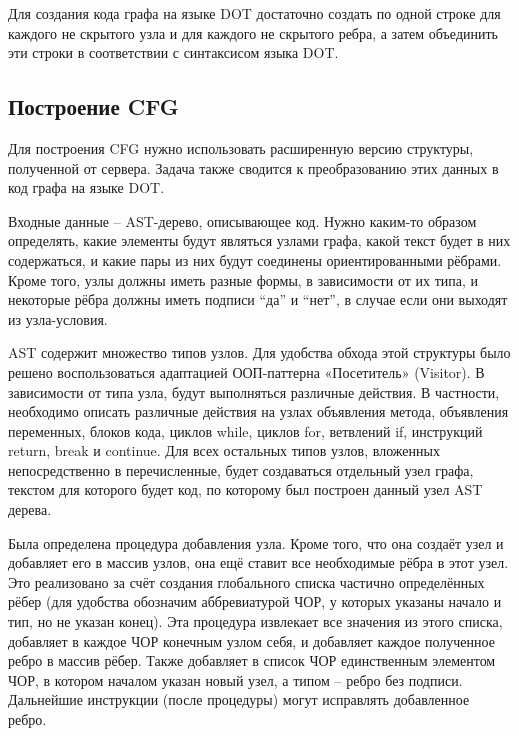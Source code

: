 Для создания кода графа на языке DOT достаточно создать по одной строке для каждого не скрытого узла и для каждого не скрытого ребра, а затем объединить эти строки в соответствии с синтаксисом языка DOT.
\subsection{Построение CFG} \label{ch2:subsec-title-abbr}
Для построения CFG нужно использовать расширенную версию структуры, полученной от сервера. Задача также сводится к преобразованию этих данных в код графа на языке DOT.

Входные данные – AST-дерево, описывающее код. Нужно каким-то образом определять, какие элементы будут являться узлами графа, какой текст будет в них содержаться, и какие пары из них будут соединены ориентированными рёбрами. Кроме того, узлы должны иметь разные формы, в зависимости от их типа, и некоторые рёбра должны иметь подписи “да” и “нет”, в случае если они выходят из узла-условия.

AST содержит множество типов узлов. Для удобства обхода этой структуры было решено воспользоваться адаптацией ООП-паттерна «Посетитель» (Visitor). В зависимости от типа узла, будут выполняться различные действия. В частности, необходимо описать различные действия на узлах объявления метода, объявления переменных, блоков кода, циклов while, циклов for, ветвлений if, инструкций return, break и continue. Для всех остальных типов узлов, вложенных непосредственно в перечисленные, будет создаваться отдельный узел графа, текстом для которого будет код, по которому был построен данный узел AST дерева.

Была определена процедура добавления узла. Кроме того, что она создаёт узел и добавляет его в массив узлов, она ещё ставит все необходимые рёбра в этот узел. Это реализовано за счёт создания глобального списка частично определённых рёбер (для удобства обозначим аббревиатурой ЧОР, у которых указаны начало и тип, но не указан конец). Эта процедура извлекает все значения из этого списка, добавляет в каждое ЧОР конечным узлом себя, и добавляет каждое полученное ребро в массив рёбер. Также добавляет в список ЧОР единственным элементом ЧОР, в котором началом указан новый узел, а типом – ребро без подписи. Дальнейшие инструкции (после процедуры) могут исправлять добавленное ребро.

